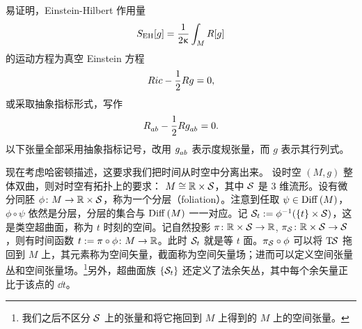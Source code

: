 		易证明，Einstein-Hilbert 作用量
		\begin{equation}
			S_{\text{EH}}[g] = \frac{1}{2\upkappa} \int_M {R}[g] 
		\end{equation}
		的运动方程为真空 Einstein 方程
		\begin{equation}
			Ric - \frac{1}{2} {R} g = 0,
		\end{equation}
		或采取抽象指标形式，写作
		\begin{equation}
			\tensor{\Ric}{_a_b} - \frac{1}{2} \curR \tensor{g}{_a_b} = 0.
		\end{equation}
		以下张量全部采用抽象指标记号，改用 $\tensor{g}{_a_b}$ 表示度规张量，而 $g$ 表示其行列式。

		现在考虑哈密顿描述，这要求我们把时间从时空中分离出来。%
		设时空 $\left( M, g \right)$ 整体双曲，则对时空有拓扑上的要求： $M \cong \mathbb{R} \times \mathcal{S}$，其中 $\mathcal{S}$ 是 $3$ 维流形\cite{wald1989}。设有微分同胚 $\phi \colon M \rightarrow \mathbb{R} \times \mathcal{S}$，称为一个分层（foliation）。注意到任取 $\psi \in \mathrm{Diff}\left(M\right)$，$\phi \circ \psi$ 依然是分层，分层的集合与 $\mathrm{Diff}\left(M\right)$ 一一对应。记 $\mathcal{S}_t := \phi^{-1}(\left\{ t \right\} \times \mathcal{S})$，这是类空超曲面，称为 $t$ 时刻的空间。记自然投影 $\pi \colon \mathbb{R} \times \mathcal{S} \rightarrow \mathbb{R}$, $\pi_{\mathcal{S}} \colon \mathbb{R} \times \mathcal{S} \rightarrow \mathcal{S}$，则有时间函数 $t := \pi \circ \phi \colon M \rightarrow \mathbb{R}$。此时 $\mathcal{S}_t$ 就是等 $t$ 面。$\pi_{\mathcal{S}} \circ \phi$ 可以将 $\mathrm{T}_{{}}\!{\mathcal{S}}$ 拖回到 $M$ 上，其元素称为空间矢量，截面称为空间矢量场；进而可以定义空间张量丛和空间张量场。\footnote{我们之后不区分 $\mathcal{S}$ 上的张量和将它拖回到 $M$ 上得到的 $M$ 上的空间张量。}另外，超曲面族 $\left\{ \mathcal{S}_t \right\}$ 还定义了法余矢丛，其中每个余矢量正比于该点的 $\dd{t}$。

